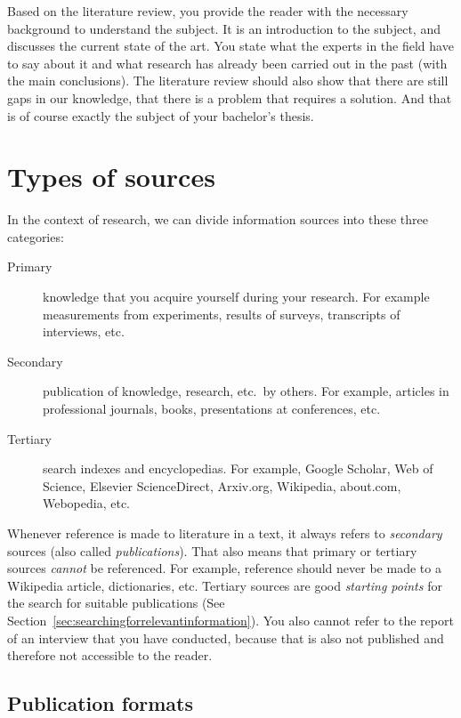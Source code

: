 Based on the literature review, you provide the reader with the necessary background to understand the subject. It is an introduction to the subject, and discusses the current state of the art. You state what the experts in the field have to say about it and what research has already been carried out in the past (with the main conclusions). The literature review should also show that there are still gaps in our knowledge, that there is a problem that requires a solution. And that is of course exactly the subject of your bachelor's thesis.

\section{Types of sources}
\label{sec:typessources}

In the context of research, we can divide information sources into these three categories:

\begin{description}
   \item[Primary] knowledge that you acquire yourself during your research. For example measurements from experiments, results of surveys, transcripts of interviews, etc.
   \item[Secondary] publication of knowledge, research, etc.~by others. For example, articles in professional journals, books, presentations at conferences, etc.
   \item[Tertiary] search indexes and encyclopedias. For example, Google Scholar, Web of Science, Elsevier ScienceDirect, Arxiv.org, Wikipedia, about.com, Webopedia, etc.
\end{description}

Whenever reference is made to literature in a text, it always refers to \emph{secondary} sources (also called \emph{publications}). That also means that primary or tertiary sources \emph{cannot} be referenced. For example, reference should never be made to a Wikipedia article, dictionaries, etc. Tertiary sources are good \textit{starting points} for the search for suitable publications (See Section~\ref{sec:searchingforrelevantinformation}). You also cannot refer to the report of an interview that you have conducted, because that is also not published and therefore not accessible to the reader.

\subsection{Publication formats}
\label{sub:publicationformats}

